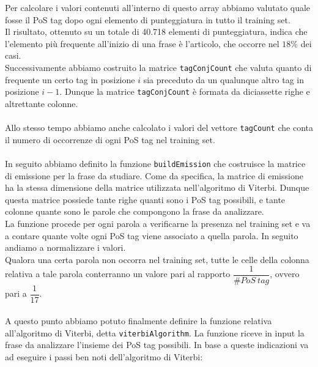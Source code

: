 \documentclass[10pt]{article}
\begin{document}
Per calcolare i valori contenuti all'interno di questo array abbiamo valutato quale fosse il PoS tag dopo ogni elemento di punteggiatura in tutto il training set.\\
Il risultato, ottenuto su un totale di 40.718 elementi di punteggiatura, indica che l'elemento più frequente all'inizio di una frase è l'articolo, che occorre nel $18\%$ dei casi.\\
Successivamente abbiamo costruito la matrice \texttt{tagConjCount} che valuta quanto di frequente un certo tag in posizione $i$ sia preceduto da un qualunque altro tag in posizione $i-1$. Dunque la matrice \texttt{tagConjCount} è formata da diciassette righe e altrettante colonne.\\
\\
Allo stesso tempo abbiamo anche calcolato i valori del vettore \texttt{tagCount} che conta il numero di occorrenze di ogni PoS tag nel training set.\\
\\
In seguito abbiamo definito la funzione \texttt{buildEmission} che costruisce la matrice di emissione per la frase da studiare. Come da specifica, la matrice di emissione ha la stessa dimensione della matrice utilizzata nell'algoritmo di Viterbi. Dunque questa matrice possiede tante righe quanti sono i PoS tag possibili, e tante colonne quante sono le parole che compongono la frase da analizzare.\\
La funzione procede per ogni parola a verificarne la presenza nel training set e va a contare quante volte ogni PoS tag viene associato a quella parola. In seguito andiamo a normalizzare i valori.\\
Qualora una certa parola non occorra nel training set, tutte le celle della colonna relativa a tale parola conterranno un valore pari al rapporto $\dfrac{1}{\#PoS\ tag}$, ovvero pari a $\dfrac{1}{17}$.\\
\\
A questo punto abbiamo potuto finalmente definire la funzione relativa all'algoritmo di Viterbi, detta  \texttt{viterbiAlgorithm}. La funzione riceve in input la frase da analizzare l'insieme dei PoS tag possibili. In base a queste indicazioni va ad eseguire i passi ben noti dell'algoritmo di Viterbi:
\end{document}
